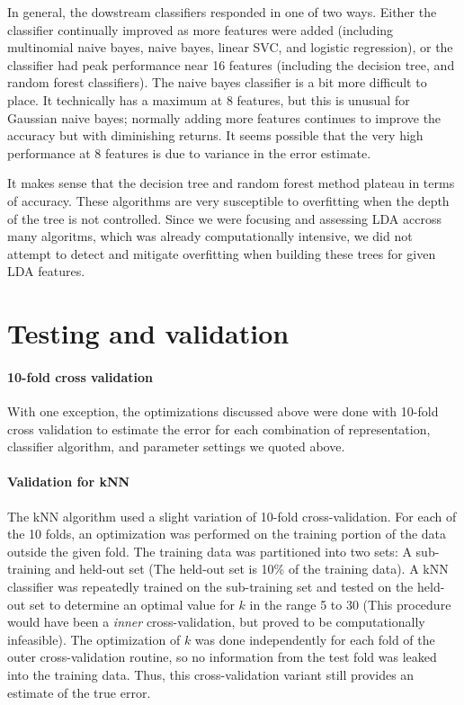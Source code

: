 \documentclass[conference,letterpaper]{IEEEtran}
\begin{document}
In general, the dowstream classifiers responded in one of two ways.  Either
the classifier continually improved as more features were added
(including multinomial naive bayes, naive bayes, linear SVC, and logistic 
regression), or the classifier had peak performance near 16 features 
(including the decision tree, and random forest classifiers).  The naive bayes
classifier is a bit more difficult to place.  It technically has a maximum at
8 features, but this is unusual for Gaussian naive bayes; normally adding
more features continues to improve the accuracy but with diminishing returns.  
It seems possible that the very high performance at 8 features is due to 
variance in the error estimate.

It makes sense that the decision tree and random forest method plateau
in terms of accuracy.  These algorithms are very susceptible to overfitting
when the depth of the tree is not controlled.  Since we were focusing and 
assessing LDA accross many algoritms, which was already computationally 
intensive, we did not attempt to detect and mitigate overfitting when building
these trees for given LDA features.

\section{Testing and validation}
\paragraph*{10-fold cross validation} 
With one exception, the optimizations discussed above were done with 
10-fold cross validation to estimate the error for each combination of 
representation, classifier algorithm, and parameter settings we quoted above.

\paragraph*{Validation for kNN}
The kNN algorithm used a slight variation of 10-fold cross-validation. For each of 
the 10 folds, an optimization was performed on the training portion of the data 
outside the given fold. The training data was partitioned into two sets: A
sub-training and held-out set (The held-out set is 10\% of the training data). A
kNN classifier was repeatedly trained on the sub-training set and tested on the
held-out set to determine an optimal value for $k$ in the range 5 to 30 (This 
procedure would have been a \textit{inner} cross-validation, but proved to be
computationally infeasible). The optimization of $k$ was done independently for 
each fold of the outer cross-validation routine, so no information from the test 
fold was leaked into the training data.  Thus, this cross-validation variant still
provides an estimate of the true error.
\end{document}

